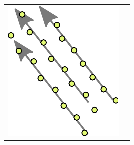 \documentclass[aspectratio=32]{beamer}
\begin{document}
\begin{frame}
\begin{center}
\begin{tabular}{ c c }
  \includegraphics[width=\textwidth/3,keepaspectratio,angle=-90,origin=c]{Bilder/advection.pdf}
	\\
\end{tabular}
\end{center}

\end{frame}
\end{document}
